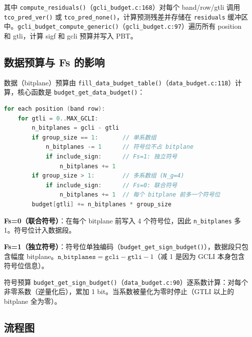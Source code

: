 其中 \texttt{compute\_residuals()}（\texttt{gcli\_budget.c:168}）对每个 band/row/gtli 调用 \texttt{tco\_pred\_ver()} 或 \texttt{tco\_pred\_none()}，计算预测残差并存储在 \texttt{residuals} 缓冲区中。\texttt{gcli\_budget\_compute\_generic()}（\texttt{gcli\_budget.c:97}）遍历所有 position 和 gtli，计算 sigf 和 gcli 预算并写入 PBT。

\subsection{数据预算与 Fs 的影响}

数据（bitplane）预算由 \texttt{fill\_data\_budget\_table()}（\texttt{data\_budget.c:118}）计算，核心函数是 \texttt{budget\_get\_data\_budget()}：

\begin{lstlisting}[language=C,numbers=none]
for each position (band row):
    for gtli = 0..MAX_GCLI:
        n_bitplanes = gcli - gtli
        if group_size == 1:       // 单系数组
            n_bitplanes -= 1      // 符号位不占 bitplane
            if include_sign:      // Fs=1: 独立符号
                n_bitplanes += 1
        if group_size > 1:        // 多系数组 (N_g=4)
            if include_sign:      // Fs=0: 联合符号
                n_bitplanes += 1  // 每个 bitplane 前多一个符号位
        budget[gtli] += n_bitplanes * group_size
\end{lstlisting}

\textbf{Fs=0（联合符号）}：在每个 bitplane 前写入 4 个符号位，因此 \texttt{n\_bitplanes} 多 1。符号位计入数据段。

\textbf{Fs=1（独立符号）}：符号位单独编码（\texttt{budget\_get\_sign\_budget()}），数据段只包含幅度 bitplane。$\texttt{n\_bitplanes} = \texttt{gcli} - \texttt{gtli} - 1$（减 1 是因为 GCLI 本身包含符号位信息）。

符号预算 \texttt{budget\_get\_sign\_budget()}（\texttt{data\_budget.c:90}）逐系数计算：对每个非零系数（逆量化后），累加 1 bit。当系数被量化为零时停止（GTLI 以上的 bitplane 全为零）。

\subsection{流程图}


